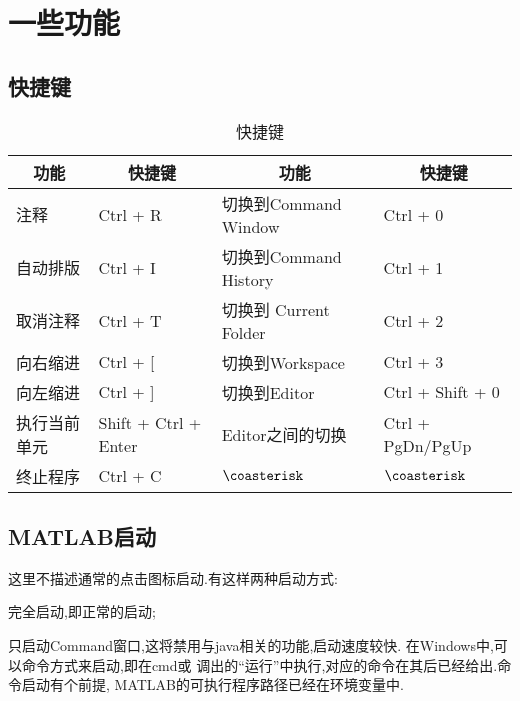 \section{一些功能}

\subsection{快捷键}

\begin{center}
\begin{table}[htbp!]
  \centering
  \caption{快捷键}
    \begin{tabular}{ll|ll}
    \toprule
    \multicolumn{1}{c}{功能}    & \multicolumn{1}{c}{快捷键}   & \multicolumn{1}{c}{功能}    & \multicolumn{1}{c}{快捷键}\\
    \midrule
    注释          & Ctrl + R              & 切换到Command Window   & Ctrl + 0  \\
    自动排版      & Ctrl + I              & 切换到Command History  & Ctrl + 1 \\
    取消注释      & Ctrl + T              & 切换到 Current Folder  & Ctrl + 2  \\
    向右缩进      & Ctrl + [              & 切换到Workspace        & Ctrl + 3 \\
    向左缩进      & Ctrl + ]              & 切换到Editor           & Ctrl + Shift + 0 \\
    执行当前单元  & Shift + Ctrl + Enter  & Editor之间的切换       & Ctrl + PgDn/PgUp \\
    终止程序      & Ctrl + C              & $\coasterisk$          & $\coasterisk$ \\
    \bottomrule
    \end{tabular}%
\end{table}%
\end{center}



\subsection{MATLAB启动}
这里不描述通常的点击图标启动.有这样两种启动方式:
\begindot
  \item 完全启动,即正常的启动; 
  \item 只启动Command窗口,这将禁用与java相关的功能,启动速度较快. 
\myenddot
在Windows中,可以命令方式来启动,即在cmd或  调出的“运行”中执行,对应的命令在其后已经给出.命令启动有个前提, MATLAB的可执行程序路径已经在环境变量中.\par

